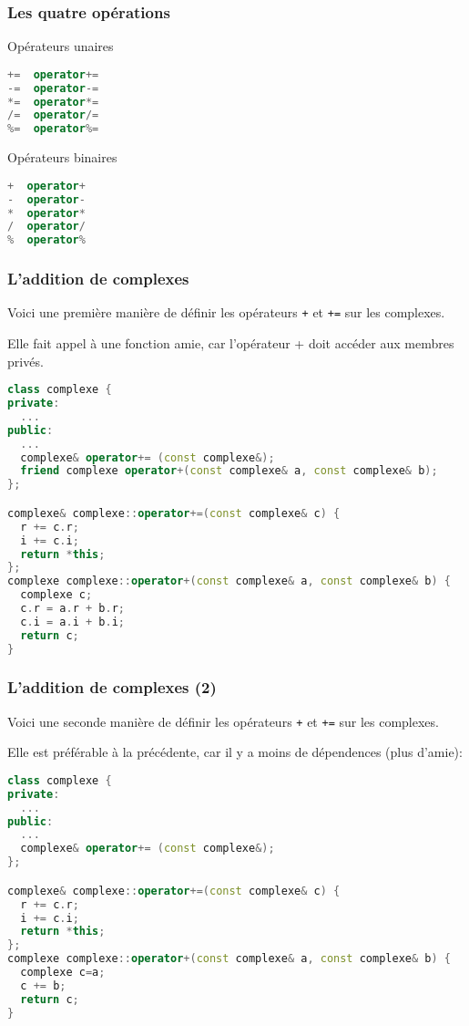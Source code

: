 \documentclass{beamer}
\begin{document}
\begin{frame}[fragile=singleslide,shrink=20]
\frametitle {Les quatre opérations}

\begin{block}{Opérateurs unaires}
\begin{lstlisting}[language=c++]
+=  operator+=
-=  operator-=
*=  operator*=
/=  operator/=
%=  operator%=
\end{lstlisting}
\end{block}

\begin{block}{Opérateurs binaires}
\begin{lstlisting}[language=c++]
+  operator+
-  operator-
*  operator*
/  operator/
%  operator%
\end{lstlisting}
\end{block}
\end{frame}

\begin{frame}[fragile=singleslide,shrink=20]
\frametitle {L'addition de complexes}

Voici une première manière de définir les opérateurs \texttt{+} et \texttt{+=} sur les complexes.

Elle fait appel à une fonction amie, car l'opérateur + doit accéder aux membres privés.
\begin{lstlisting}[language=c++]
class complexe {
private:
  ...
public:
  ...
  complexe& operator+= (const complexe&);
  friend complexe operator+(const complexe& a, const complexe& b);
};

complexe& complexe::operator+=(const complexe& c) {
  r += c.r;
  i += c.i;
  return *this;
};
complexe complexe::operator+(const complexe& a, const complexe& b) {
  complexe c;
  c.r = a.r + b.r;
  c.i = a.i + b.i;
  return c;
}
\end{lstlisting}
\end{frame}

\begin{frame}[fragile=singleslide,shrink=20]
\frametitle {L'addition de complexes (2)}

Voici une seconde manière de définir les opérateurs \texttt{+} et \texttt{+=} sur les complexes.

Elle est préférable à la précédente, car il y a moins de dépendences (plus d'amie):
\begin{lstlisting}[language=c++]
class complexe {
private:
  ...
public:
  ...
  complexe& operator+= (const complexe&);
};

complexe& complexe::operator+=(const complexe& c) {
  r += c.r;
  i += c.i;
  return *this;
};
complexe complexe::operator+(const complexe& a, const complexe& b) {
  complexe c=a;
  c += b;
  return c;
}
\end{lstlisting}
\end{frame}
\end{document}
